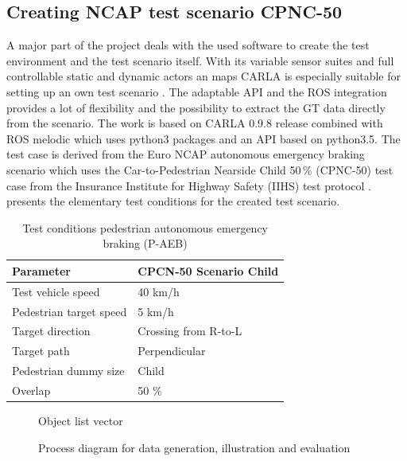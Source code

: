 \subsection{Creating NCAP test scenario CPNC-50}
A major part of the project deals with the used software to create the test environment and the test scenario itself. With its variable sensor suites and full controllable static and dynamic actors an maps CARLA is especially suitable for setting up an own test scenario \cite{Dosovitskiy17}. The adaptable \ac{API} and the \ac{ROS} integration provides a lot of flexibility and the possibility to extract the \ac{GT} data directly from the scenario. The work is based on CARLA 0.9.8 release combined with \ac{ROS} melodic which uses python3 packages and an \ac{API} based on python3.5. The test case is derived from the Euro NCAP autonomous emergency braking scenario which uses the Car-to-Pedestrian Nearside Child 50\,\% (CPNC-50) test case from the Insurance Institute for Highway Safety (IIHS) test protocol \cite{NCAP, Protocoll}.  presents the elementary test conditions for the created test scenario. 

\begin{table}[h]
	\caption{Test conditions pedestrian autonomous emergency braking (P-AEB) \cite{Protocoll}}
	\label{Test conditions}
	\begin{center}
		\begin{tabular}{l l}
			\hline
			Parameter & CPCN-50 Scenario Child\\
			\hline
			Test vehicle speed & 40 km/h\\
			Pedestrian target speed & 5 km/h\\
			Target direction        & Crossing from R-to-L\\
			Target path             & Perpendicular\\
			Pedestrian dummy size   & Child\\
			Overlap                 & 50 \%\\
			\hline
			
			
		\end{tabular}
	\end{center}
\end{table}


\begin{figure}[H]
	\centering
	\caption{Object list vector \cite{Aeberhard}}
	\label{fig:vectors}
\end{figure}

	
\begin{figure}[]
	\centering
	\caption{Process diagram for data generation, illustration and evaluation}
	\label{fig:Overview}
\end{figure}


